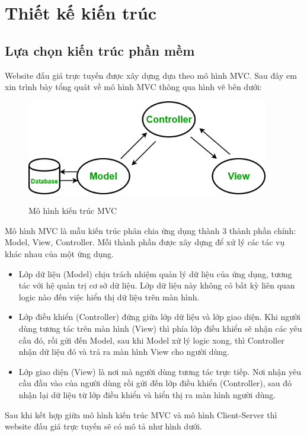 \documentclass[../DoAn.tex]{subfiles}
\begin{document}
\section{Thiết kế kiến trúc}
\subsection{Lựa chọn kiến trúc phần mềm}
Website đấu giá trực tuyến được xây dựng dựa theo mô hình MVC. Sau đây em xin trình bày tổng quát về mô hình MVC thông qua hình vẽ bên dưới: 
\begin{figure}[H]
    \centering
    \includegraphics[width=10.6cm,height=4.15cm]{Hinhve/mvc.png}\cite{MVC}
    \caption{Mô hình kiến trúc MVC}
    \label{fig:Fig41}
\end{figure}
Mô hình MVC là mẫu kiến trúc phân chia ứng dụng thành 3 thành phần chính: Model, View, Controller. Mỗi thành phần được xây dựng để xử lý các tác vụ khác nhau của một ứng dụng\cite{MVC2}.
\begin{itemize}
    \item Lớp dữ liệu (Model) chịu trách nhiệm quản lý dữ liệu của ứng dụng, tương tác với hệ quản trị cơ sở dữ liệu. Lớp dữ liệu này không có bất kỳ liên quan logic nào đến việc hiển thị dữ liệu trên màn hình.
    \item Lớp điều khiển (Controller) đứng giữa lớp dữ liệu và lớp giao diện. Khi người dùng tương tác trên màn hình (View) thì phía lớp điều khiển sẽ nhận các yêu cầu đó, rồi gửi đến Model, sau khi Model xử lý logic xong, thì Controller nhận dữ liệu đó và trả ra màn hình View cho người dùng.
    \item Lớp giao diện (View) là nơi mà người dùng tương tác trực tiếp. Nơi nhận yêu cầu đầu vào của người dùng rồi gửi đến lớp điều khiển (Controller), sau đó nhận lại dữ liệu từ lớp điều khiển và hiển thị ra màn hình người dùng.
\end{itemize}
\newpage
Sau khi kết hợp giữa mô hình kiến trúc MVC và mô hình Client-Server thì website đấu giá trực tuyến sẽ có mô tả như hình dưới. 
\end{document}
